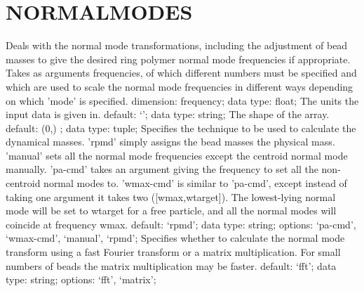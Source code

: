 \section{NORMALMODES}
\label{NORMALMODES}
\begin{ipifield}{}%
{Deals with the normal mode transformations, including the adjustment of bead masses to give the desired ring polymer normal mode frequencies if appropriate. Takes as arguments frequencies, of which different numbers must be specified and which are used to scale the normal mode frequencies in different ways depending on which 'mode' is specified.}%
{dimension: frequency; data type: float; }%
{%
{The units the input data is given in.}%
{default: `'; data type: string; }%
%
{The shape of the array.}%
{default:  (0,) ; data type: tuple; }%
%
{Specifies the technique to be used to calculate the dynamical masses. 'rpmd' simply assigns the bead masses the physical mass. 'manual' sets all the normal mode frequencies except the centroid normal mode manually. 'pa-cmd' takes an argument giving the frequency to set all the non-centroid normal modes to. 'wmax-cmd' is similar to 'pa-cmd', except instead of taking one argument it takes two ([wmax,wtarget]). The lowest-lying normal mode will be set to wtarget for a free particle, and all the normal modes will coincide at frequency wmax. }%
{default: `rpmd'; data type: string; options: `pa-cmd', `wmax-cmd', `manual', `rpmd'; }%
%
{Specifies whether to calculate the normal mode transform using a fast Fourier transform or a matrix multiplication. For small numbers of beads the matrix multiplication may be faster.}%
{default: `fft'; data type: string; options: `fft', `matrix'; }%
}
\end{ipifield}
